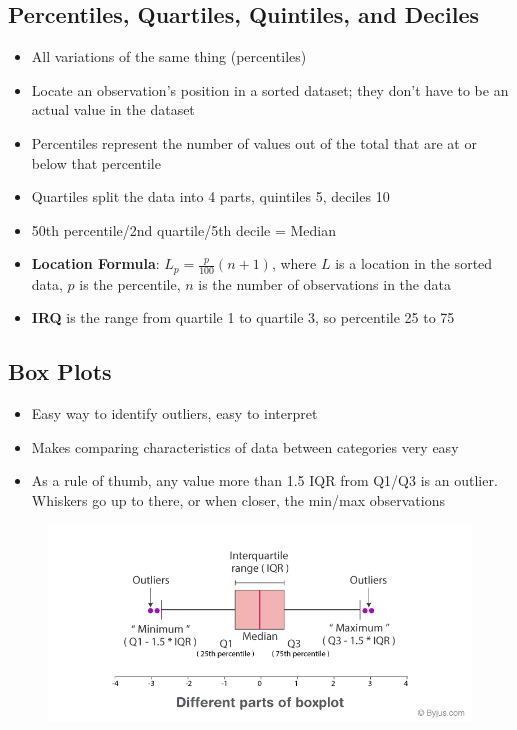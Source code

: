 \documentclass{article}
\begin{document}
\subsection{Percentiles, Quartiles, Quintiles, and Deciles}

\begin{itemize}
    \item All variations of the same thing (percentiles)
    \item Locate an observation's position in a sorted dataset; they don't have to be an actual value in the dataset
    \item Percentiles represent the number of values out of the total that are at or below that percentile
    \item Quartiles split the data into 4 parts, quintiles 5, deciles 10
    \item 50th percentile/2nd quartile/5th decile = Median
    \item \textbf{Location Formula}: $L_p = \frac{p}{100}(n+1)$, where $L$ is a location in the sorted data, $p$ is the percentile, $n$ is the number of observations in the data
    \item \textbf{IRQ} is the range from quartile 1 to quartile 3, so percentile 25 to 75
\end{itemize}

\subsection{Box Plots}

\begin{itemize}
    \item Easy way to identify outliers, easy to interpret
    \item Makes comparing characteristics of data between categories very easy
    \item As a rule of thumb, any value more than 1.5 IQR from Q1/Q3 is an outlier. Whiskers go up to there, or when closer, the min/max observations
\end{itemize}

\begin{figure}
    \includegraphics[width=1.0\linewidth]{images/Box-Plot-and-Whisker-Plot.png}
\end{figure}
\end{document}

